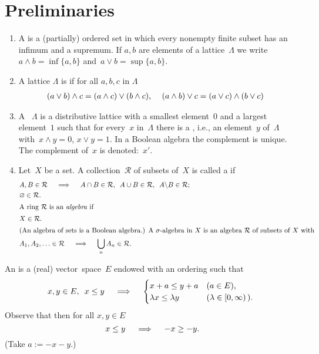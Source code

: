 \documentclass[main.tex]{subfiles}
\begin{document}
\section{Preliminaries}
%
%
\begin{psec}[Definitions]
\label{1.1}
\begin{enumerate}
\item 
A  is a (partially) ordered set in which
every nonempty finite subset has an infimum and a supremum. 
If $a,b$ are elements of a lattice~$\Lambda$ 
we write~$a\wedge b = \inf\{a,b\}$
and~$a\vee b = \sup\{a,b\}$.
\item 
A lattice $\Lambda$ is 
if for all $a,b,c$ in $\Lambda$
\begin{align*}
(a\vee b)\wedge c &= (a\wedge c)\vee (b\wedge c)\textnormal{, } &
(a\wedge b)\vee c &= (a\vee c) \wedge (b\vee c) 
\end{align*}
\item 
A ~$\Lambda$ is a distributive lattice
with a smallest element~$0$
and a largest element~$1$
such that for every~$x$ in~$\Lambda$
there is a ,
i.e., 
an element~$y$ of~$\Lambda$
with~$x\wedge y=0$, $x\vee y=1$.
In a Boolean algebra the complement is unique.
The complement of~$x$ is denoted:~$x'$.
\item 
Let~$X$ be a set.
A collection~$\mathcal{R}$ 
of subsets of~$X$
is called a  if
\begin{align*}
&A,B\in\mathcal{R} \quad \implies \quad 
  A\cap B \in \mathcal{R}\htam{, }\ 
  A\cup B \in \mathcal{R}\htam{, }\ 
  A\backslash B \in \mathcal{R}\htam{; } \\
&\varnothing \in \mathcal{R} 
\htam{.} \\
\intertext{%
A ring~$\mathcal{R}$ is an \keyword{algebra} if%
}
&X \in \mathcal{R}
\htam{.} \\
\intertext{%
(An algebra of sets is a Boolean algebra.) 
A $\sigma$-algebra in~$X$
is an algebra~$\mathcal{R}$
of subsets of~$X$
with%
}
& A_1, A_2, \ldots \in \mathcal{R}\quad \implies\quad 
  \bigcup_n A_n \in \mathcal{R}
\htam{.}
\end{align*}
\end{enumerate}
\end{psec}
%
%
\begin{psec}[Definition]
\label{1.2}
An  
is a (real) vector~space~$E$
endowed with an ordering such that
\begin{equation*}
x,y\in E\textnormal{, }\ x\leq y
 \quad \implies \quad
\begin{cases}
x+a \leq y+a  
  & (a\in E)\textnormal{, } \\
\lambda x \leq \lambda y 
  & (\lambda \in [0,\infty)\,)\textnormal{. }
\end{cases}
\end{equation*}
Observe that then for all $x,y\in E$
\begin{equation*}
x\leq y \quad \implies \quad -x \geq -y\textnormal{.}
\end{equation*}
(Take $a:=-x-y$.)
\end{psec}
\end{document}
